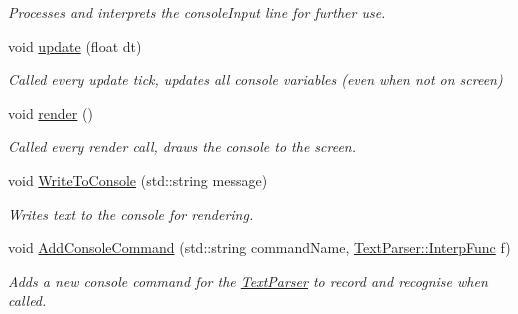 \begin{DoxyCompactItemize}
\begin{DoxyCompactList}\small\item\em Processes and interprets the console\+Input line for further use. \end{DoxyCompactList}\item 
\hypertarget{class_debug_helper_a8ef4429ee0c1146b563c53d4a4b44ca8}{void \hyperlink{class_debug_helper_a8ef4429ee0c1146b563c53d4a4b44ca8}{update} (float dt)}\label{class_debug_helper_a8ef4429ee0c1146b563c53d4a4b44ca8}

\begin{DoxyCompactList}\small\item\em Called every update tick, updates all console variables (even when not on screen) \end{DoxyCompactList}\item 
\hypertarget{class_debug_helper_a2af378fe6006f6024d5486d8090732aa}{void \hyperlink{class_debug_helper_a2af378fe6006f6024d5486d8090732aa}{render} ()}\label{class_debug_helper_a2af378fe6006f6024d5486d8090732aa}

\begin{DoxyCompactList}\small\item\em Called every render call, draws the console to the screen. \end{DoxyCompactList}\item 
\hypertarget{class_debug_helper_a44cff1d53586f120fcab4b8e3e84e438}{void \hyperlink{class_debug_helper_a44cff1d53586f120fcab4b8e3e84e438}{Write\+To\+Console} (std\+::string message)}\label{class_debug_helper_a44cff1d53586f120fcab4b8e3e84e438}

\begin{DoxyCompactList}\small\item\em Writes text to the console for rendering. \end{DoxyCompactList}\item 
\hypertarget{class_debug_helper_a0395140c6b19bba0c8e10809b22a136f}{void \hyperlink{class_debug_helper_a0395140c6b19bba0c8e10809b22a136f}{Add\+Console\+Command} (std\+::string command\+Name, \hyperlink{class_text_parser_a9cd16418d2032d830f4ed2c2624e703d}{Text\+Parser\+::\+Interp\+Func} f)}\label{class_debug_helper_a0395140c6b19bba0c8e10809b22a136f}

\begin{DoxyCompactList}\small\item\em Adds a new console command for the \hyperlink{class_text_parser}{Text\+Parser} to record and recognise when called. \end{DoxyCompactList}\end{DoxyCompactItemize}
